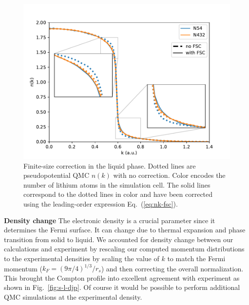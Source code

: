 \documentclass[aps,prb,showpacs,preprintnumbers,amsmath,amssymb,superscriptaddress,twocolumn]{revtex4-1}
\begin{document}
\begin{figure}
\includegraphics[width=\linewidth]{li58h_liquid-fsc}
\caption{Finite-size correction in the liquid phase. Dotted lines are pseudopotential QMC $n(k)$ with no correction. Color encodes the number of lithium atoms in the simulation cell. The solid lines correspond to the dotted lines in color and have been corrected using the leading-order expression Eq.~(\ref{eq:nk-fsc}). \label{fig:liquid-nk-fsc}}
\end{figure}

{\bf Density change} The electronic density is a crucial parameter since it determines the Fermi surface. It can change due to thermal expansion and phase transition from solid to liquid.
We accounted for density change between our calculations and experiment by rescaling our computed momentum distributions to the experimental densities by scaling the value of $k$ to match the Fermi momentum ($k_F=(9\pi/4)^{1/3}/r_s$) and then correcting the overall normalization.
This brought the Compton profile into excellent agreement with experiment as shown in Fig.~\ref{fig:s-l-djp}.  Of course it would be possible to perform additional QMC simulations at the experimental density. %
\end{document}
